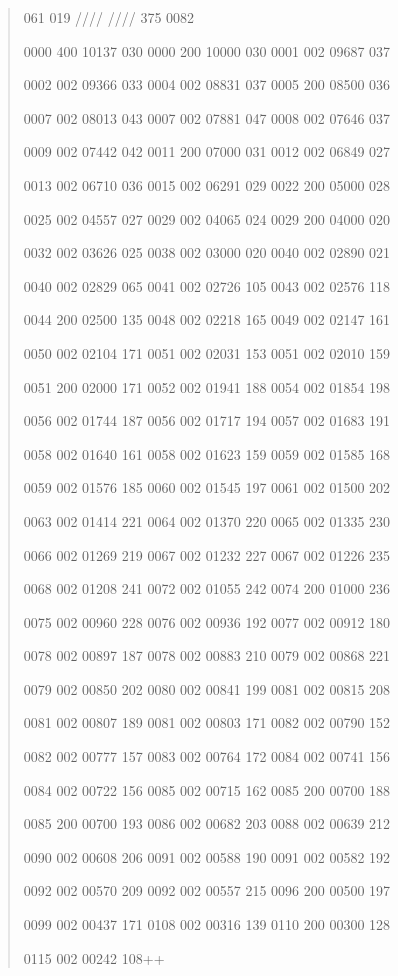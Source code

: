 \begin{quote}
061 019 //// //// 375 0082

0000 400 10137 030 0000 200 10000 030 0001 002 09687 037

0002 002 09366 033 0004 002 08831 037 0005 200 08500 036

0007 002 08013 043 0007 002 07881 047 0008 002 07646 037

0009 002 07442 042 0011 200 07000 031 0012 002 06849 027

0013 002 06710 036 0015 002 06291 029 0022 200 05000 028

0025 002 04557 027 0029 002 04065 024 0029 200 04000 020

0032 002 03626 025 0038 002 03000 020 0040 002 02890 021

0040 002 02829 065 0041 002 02726 105 0043 002 02576 118

0044 200 02500 135 0048 002 02218 165 0049 002 02147 161

0050 002 02104 171 0051 002 02031 153 0051 002 02010 159

0051 200 02000 171 0052 002 01941 188 0054 002 01854 198

0056 002 01744 187 0056 002 01717 194 0057 002 01683 191

0058 002 01640 161 0058 002 01623 159 0059 002 01585 168

0059 002 01576 185 0060 002 01545 197 0061 002 01500 202

0063 002 01414 221 0064 002 01370 220 0065 002 01335 230

0066 002 01269 219 0067 002 01232 227 0067 002 01226 235

0068 002 01208 241 0072 002 01055 242 0074 200 01000 236

0075 002 00960 228 0076 002 00936 192 0077 002 00912 180

0078 002 00897 187 0078 002 00883 210 0079 002 00868 221

0079 002 00850 202 0080 002 00841 199 0081 002 00815 208

0081 002 00807 189 0081 002 00803 171 0082 002 00790 152

0082 002 00777 157 0083 002 00764 172 0084 002 00741 156

0084 002 00722 156 0085 002 00715 162 0085 200 00700 188

0085 200 00700 193 0086 002 00682 203 0088 002 00639 212

0090 002 00608 206 0091 002 00588 190 0091 002 00582 192

0092 002 00570 209 0092 002 00557 215 0096 200 00500 197

0099 002 00437 171 0108 002 00316 139 0110 200 00300 128

0115 002 00242 108++
\end{quote}


